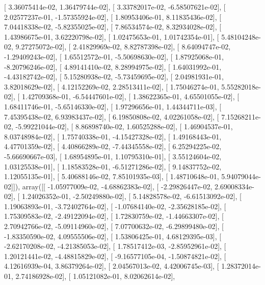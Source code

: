 \documentclass{article}
\begin{document}
       [  3.36075414e-02,   1.36479744e-02],
       [  3.33782017e-02,  -6.58507621e-02],
       [  2.02577237e-01,  -1.57355924e-02],
       [  1.80953406e-01,   8.11835436e-02],
       [  7.04418338e-02,  -5.82355025e-02],
       [  7.86534574e-02,   8.32934028e-02],
       [  1.43986675e-01,   3.62220798e-02],
       [  1.02475653e-01,   1.01742354e-01],
       [  5.48104248e-02,   9.27275072e-02],
       [  2.41829969e-02,   8.82787398e-02],
       [  8.64094747e-02,  -1.29409243e-02],
       [  1.65512572e-01,  -5.50698630e-02],
       [  1.87925068e-01,  -8.20796246e-02],
       [  4.89141410e-02,   8.28994975e-02],
       [  1.64031992e-01,  -4.43182742e-02],
       [  5.15280938e-02,  -5.73459695e-02],
       [  2.04981931e-01,   3.82018629e-02],
       [  4.12152269e-02,   2.28513411e-02],
       [  1.75046274e-01,   5.55282018e-02],
       [  1.42709368e-01,  -6.54447601e-02],
       [  1.38622365e-01,   4.65501055e-02],
       [  1.68411746e-01,  -5.65146330e-02],
       [  1.97296656e-01,   1.44344711e-03],
       [  7.45395438e-02,   6.93983437e-02],
       [  6.19850808e-02,   4.02261058e-02],
       [  7.15268211e-02,  -5.99221044e-02],
       [  8.86898740e-02,   1.60525288e-02],
       [  1.46904537e-01,   8.03748984e-02],
       [  1.75740338e-01,  -4.15427328e-02],
       [  1.49168443e-01,   4.47701359e-02],
       [  4.40866289e-02,  -7.44345558e-02],
       [  6.25294225e-02,  -5.66690667e-03],
       [  1.68954895e-01,   1.10795310e-01],
       [  3.55124604e-02,   1.03125538e-01],
       [  1.18583528e-01,  -6.51271286e-02],
       [  9.14837752e-02,   1.12055135e-01],
       [  5.40688146e-02,   7.85101935e-03],
       [  1.48710648e-01,   5.94079044e-02]]), array([[ -1.05977009e-02,  -4.68862383e-02],
       [ -2.29826447e-02,   2.69008334e-02],
       [  1.24026352e-01,  -2.50249880e-02],
       [  5.14828578e-02,  -6.61513092e-02],
       [  1.19063893e-01,  -3.72402764e-02],
       [ -1.07684140e-02,  -2.35628185e-02],
       [  1.75309583e-02,  -2.49122094e-02],
       [  1.72830759e-02,  -1.44663307e-02],
       [  2.70942766e-02,  -5.09114960e-02],
       [  7.07700632e-02,  -6.29899480e-02],
       [ -1.83350590e-02,   4.09555506e-02],
       [  1.53806425e-01,   4.68129395e-03],
       [ -2.62170208e-02,  -4.21385053e-02],
       [  1.78517412e-03,  -2.85952961e-02],
       [  1.20121441e-02,  -4.48815829e-02],
       [ -9.16577105e-04,  -1.50874821e-02],
       [  4.12616939e-04,   3.86379264e-02],
       [  2.04567013e-02,   4.42006745e-03],
       [  1.28372014e-01,   2.74186928e-02],
       [  1.05121082e-01,   8.02062614e-02],
\end{document}
